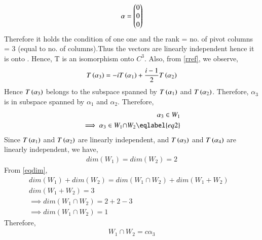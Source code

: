 \documentclass[journal,12pt,twocolumn]{IEEEtran}
\begin{document}
\begin{align}
    \mathbf{\alpha} = \begin{pmatrix}0\\0\\0\end{pmatrix}
\end{align}
Therefore it holds the condition of one one and the rank = no. of pivot columns = 3 (equal to no. of columns).Thus the  vectors are linearly independent hence it is onto . Hence, T is an isomorphism onto $C^{3}$. \newline
Also, from \eqref{rref}, we observe,
\begin{align}
   T\left(\alpha_3\right)=-i T\left(\alpha_1\right)+\frac{i-1}{2}T\left(\alpha_2\right) 
\end{align}
 Hence $T\left(\alpha_3\right)$ belongs to the subspace spanned by $T\left(\alpha_1\right)$ and $T\left(\alpha_2\right)$.\newline
 Therefore, $\alpha_3$ is in subspace spanned by  $\alpha_1$ and $\alpha_2$. Therefore,
 \begin{align}
     \alpha_3 \in W_1\\
     \implies \alpha_3 \in W_1 {\displaystyle \cap } W_2\eqlabel{eq2}
 \end{align}
  Since $T\left(\alpha_1\right)$ and $T\left(\alpha_2\right)$ are linearly independent, and $T\left(\alpha_3\right)$ and $T\left(\alpha_4\right)$ are linearly independent, we have,
  \begin{align}
      dim(W_1) = dim(W_2) = 2
  \end{align}
  From \eqref{eqdim},
  \begin{align}
      dim(W_1)+dim(W_2)=dim(W_1 {\displaystyle \cap } W_2)+dim(W_1+W_2)&\\
      dim(W_1+W_2)=3&\\
      \implies dim(W_1 {\displaystyle \cap } W_2)=2+2-3&\\
      \implies dim(W_1 {\displaystyle \cap } W_2)=1&
  \end{align}
  Therefore,
  \begin{align}
      W_1 {\displaystyle \cap } W_2=c\alpha_3
  \end{align}
\end{document}
